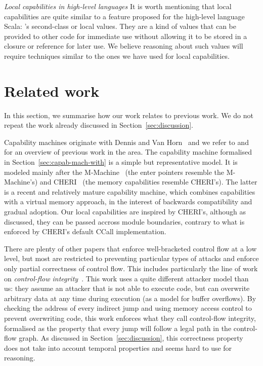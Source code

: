 \documentclass[compsoc,conference,letterpaper,fleqn]{IEEEtran}
\begin{document}
\emph{Local capabilities in high-level languages} It is worth mentioning that
local capabilities are quite similar to a feature proposed for the high-level
language Scala: \citet{osvald_gentrification_2016}'s second-class or local
values. They are a kind of values that can be provided to other code for
immediate use without allowing it to be stored in a closure or reference for
later use. We believe reasoning about such values will require techniques similar 
to the ones we have used for local capabilities.

\section{Related work}
\label{sec:related-work}

In this section, we summarise how our work relates to previous work. We do not
repeat the work already discussed in Section~\ref{sec:discussion}.

Capability machines originate with Dennis and Van
Horn~\cite{Dennis:1966:PSM:365230.365252} and we refer to
\citet{Levy1984capability} and \citet{Watson2015Cheri} for an overview of
previous work in the area. The capability machine formalised in
Section~\ref{sec:capab-mach-with} is a simple but representative model. It is modeled
mainly after the M-Machine~\cite{Carter:1994:HSF:195473.195579} (the enter
pointers resemble the M-Machine's) and
CHERI~\cite{Watson2015Cheri,Woodruff:2014:CCM:2665671.2665740} (the memory
capabilities resemble CHERI's). The latter is a recent and relatively mature
capability machine, which combines capabilities with a virtual memory approach,
in the interest of backwards compatibility and gradual adoption. Our local
capabilities are inspired by CHERI's, although as discussed, they can be passed
accross module boundaries, contrary to what is enforced by CHERI's default CCall
implementation.

There are plenty of other papers that enforce well-bracketed control flow at a
low level, but most are restricted to preventing particular types of attacks and
enforce only partial correctness of control flow. This includes particularly the
line of work on \emph{control-flow integrity}~\citep{abadi_control-flow_2005}.
This work uses a quite different attacker model than us: they assume an attacker
that is not able to execute code, but can overwrite arbitrary data at any time
during execution (as a model for buffer overflows). By checking the address of
every indirect jump and using memory access control to prevent overwriting code,
this work enforces what they call control-flow integrity, formalised as the
property that every jump will follow a legal path in the control-flow graph.
As discussed in Section~\ref{sec:discussion}, this correctness property does not
take into account temporal properties and seems hard to use for reasoning. 
\end{document}
